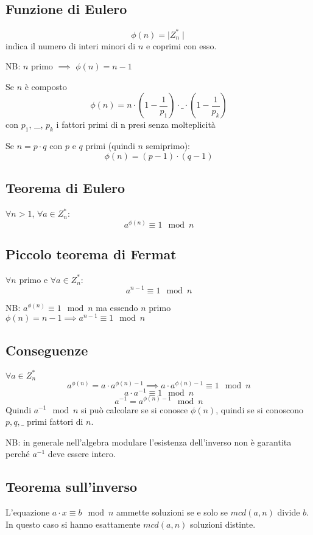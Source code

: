 \subsection{Funzione di Eulero}
$$ \phi(n) = \mid Z_{n}^{*} \mid $$
indica il numero di interi minori di $n$ e coprimi con esso.

NB: $n$ primo $\implies$ $\phi(n) = n-1$

Se $n$ è composto
$$ \phi(n) = n \cdot (1 - \frac{1}{p_1}) \cdot \_ \cdot (1 - \frac{1}{p_k})$$
con $p_1$, \_, $p_k$ i fattori primi di n presi senza molteplicità

Se $n = p \cdot q$ con $p$ e $q$ primi (quindi $n$ semiprimo):
$$ \phi(n) = (p-1) \cdot (q-1) $$

\subsection{Teorema di Eulero}
$\forall n>1$, $\forall a \in Z_{n}^*$:
$$ a^{\phi(n)} \equiv 1 \mod n $$

\subsection{Piccolo teorema di Fermat}
$\forall n$ primo e $\forall a \in Z_{n}^*$:
$$ a^{n-1} \equiv 1 \mod n $$

NB: $ a^{\phi(n)} \equiv 1 \mod n $ ma essendo $n$ primo $\phi(n) = n-1 \implies  a^{n-1} \equiv 1 \mod n $

\subsection{Conseguenze}
$\forall a \in Z_{n}^*$
$$ a^{\phi(n)} = a \cdot a^{\phi(n)-1} \implies a \cdot a^{\phi(n)-1} \equiv 1 \mod n $$
$$ a \cdot a^{-1} \equiv 1 \mod n $$
$$ a^{-1} = a^{\phi(n)-1} \mod n $$
Quindi $a^{-1} \mod n$ si può calcolare se si conosce $\phi(n)$, quindi se si conoscono $p, q, \_$ primi fattori di $n$.

NB: in generale nell'algebra modulare l'esistenza dell'inverso non è garantita perché $a^{-1}$ deve essere intero.

\subsection{Teorema sull'inverso}
L'equazione $a \cdot x \equiv b \mod n$ ammette soluzioni se e solo se $mcd(a,n)$ divide $b$.
In questo caso si hanno esattamente $mcd(a,n)$ soluzioni distinte.

